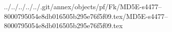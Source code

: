 ../../../../../.git/annex/objects/pf/Fk/MD5E-s4477--8000795054e8db016505b295e76f5f09.tex/MD5E-s4477--8000795054e8db016505b295e76f5f09.tex